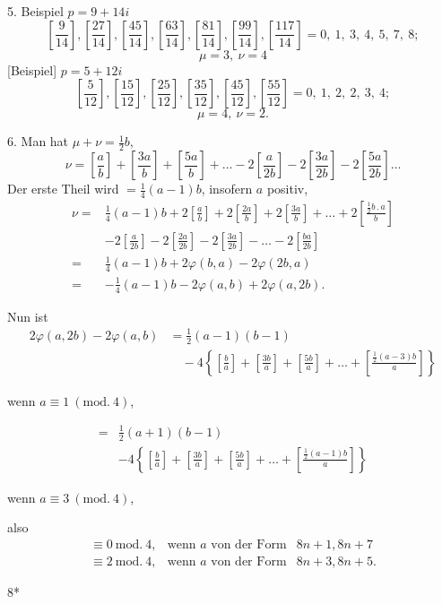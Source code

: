 5. Beispiel $p=9+14i$
\[
\left[\frac9{14}\right],\left[\frac{27}{14}\right],\left[\frac{45}{14}\right],\left[\frac{63}{14}\right],\left[\frac{81}{14}\right],\left[\frac{99}{14}\right],\left[\frac{117}{14}\right]=0,\ 1,\ 3,\ 4,\ 5,\ 7,\ 8;
\]
\[
\mu=3,\ \nu=4
\]
\noindent\hspace*{\parindent}[Beispiel] $p=5+12i$
\[
\left[\frac5{12}\right],\left[\frac{15}{12}\right],\left[\frac{25}{12}\right],\left[\frac{35}{12}\right],\left[\frac{45}{12}\right],\left[\frac{55}{12}\right]=0,\ 1,\ 2,\ 2,\ 3,\ 4;
\]
\[
\mu=4,\ \nu=2.
\]
\par\noindent\hspace*{\parindent}6. Man hat $\mu+\nu=\tfrac12b$,
\[
\nu=\left[\frac ab\right]+\left[\frac{3a}b\right]+\left[\frac{5a}b\right]+\ldots-2\left[\frac a{2b}\right]-2\left[\frac{3a}{2b}\right]-2\left[\frac{5a}{2b}\right]\ldots
\]
\noindent Der erste Theil wird $=\tfrac14(a-1)b$, insofern $a$ positiv,
\[
\begin{aligned}
\nu={}&\tfrac14(a-1)b+2\left[\frac ab\right]+2\left[\frac{2a}b\right]+2\left[\frac{3a}b\right]+\ldots+2\left[\frac{\tfrac12b\mathpunct{.}a}b\right]\\
&-2\left[\frac a{2b}\right]-2\left[\frac{2a}{2b}\right]-2\left[\frac{3a}{2b}\right]-\ldots-2\left[\frac{ba}{2b}\right]\\
={}&\tfrac14(a-1)b+2\varphi(b,a)-2\varphi(2b,a)\\
={}&-\tfrac14(a-1)b-2\varphi(a,b)+2\varphi(a,2b).
\end{aligned}
\]
\par\noindent\hspace*{\parindent}Nun ist
\[
\begin{aligned}
2\varphi(a,2b)-2\varphi(a,b)&=\tfrac12(a-1)(b-1)\\
&\quad-4\left\{\left[\frac ba\right]+\left[\frac{3b}a\right]+\left[\frac{5b}a\right]+\ldots+\left[\frac{\tfrac12(a-3)b}a\right]\right\}
\end{aligned}
\]
\centerline{wenn $a\equiv1\ (\mathrm{mod.}\ 4)$,}
\[
\begin{aligned}
{}={}&\tfrac12(a+1)(b-1)\\
&-4\left\{\left[\frac ba\right]+\left[\frac{3b}a\right]+\left[\frac{5b}a\right]+\ldots+\left[\frac{\tfrac12(a-1)b}a\right]\right\}
\end{aligned}
\]
\centerline{wenn $a\equiv3\ (\mathrm{mod.}\ 4)$,}
\noindent also
\[
\begin{array}{cll}
\equiv0\ \mathrm{mod.}\ 4,&\text{wenn $a$ von der Form}&8n+1,8n+7\\
\equiv2\ \mathrm{mod.}\ 4,&\text{wenn $a$ von der Form}&8n+3,8n+5.
\end{array}
\]
\par\vfill\noindent\hfill8*\par\clearpage
